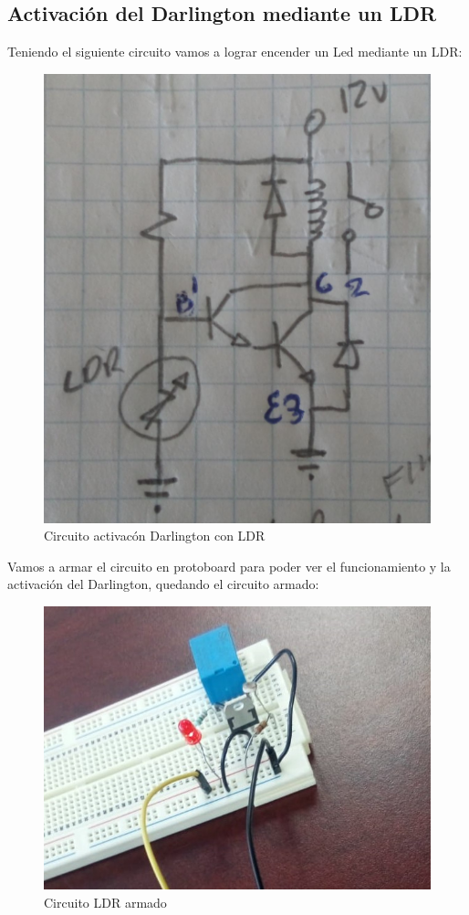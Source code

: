 \documentclass[10pt,a4paper]{article}
\begin{document}
\subsection{Activación del Darlington mediante un LDR}
Teniendo el siguiente circuito vamos a lograr encender un Led mediante un LDR:
\begin{figure}[hbtp]
 \centering
 \includegraphics[scale=0.1]{Pictures/LDRA.jpeg}
 \caption{Circuito activacón Darlington con LDR}
 \end{figure}
  
Vamos a armar el circuito en protoboard para poder ver el funcionamiento y la activación del Darlington, quedando el circuito armado: 
\begin{figure}[hbtp]
\caption{Circuito LDR armado}
\centering
\includegraphics[scale=0.4]{Pictures/LDR.jpeg}
\end{figure}
\end{document}
